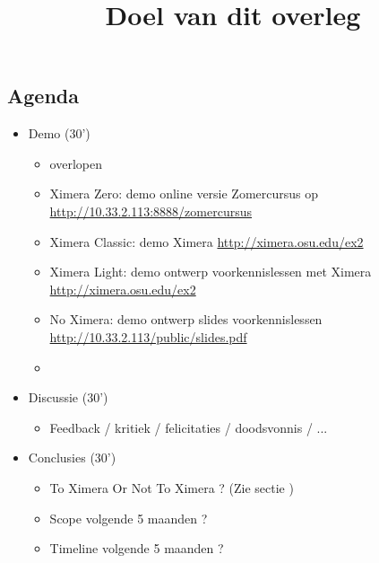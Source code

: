 \documentclass[numbers]{ximera}
\title{Doel van dit overleg}
\renewcommand{\link}{\url}
\begin{document}
\begin{abstract}
\end{abstract}
\maketitle

\subsection{Agenda}
\begin{itemize}
    \item Demo (30')
    \begin{itemize}
        \item overlopen 
        \item Ximera Zero: demo online versie Zomercursus op \link{http://10.33.2.113:8888/zomercursus}  
        \item Ximera Classic: demo Ximera \link{http://ximera.osu.edu/ex2} 
        \item Ximera Light: demo ontwerp voorkennislessen met Ximera \link{http://ximera.osu.edu/ex2}
        \item No Ximera: demo ontwerp slides voorkennislessen \link{http://10.33.2.113/public/slides.pdf} 
        \item {}
    \end{itemize}
    \item Discussie (30')
    \begin{itemize}
        \item Feedback / kritiek / felicitaties / doodsvonnis / ...
    \end{itemize}

    \item Conclusies  (30')
        \begin{itemize}
        \item To Ximera Or Not To Ximera ? (Zie sectie )
        \item Scope volgende 5 maanden ?
        \item Timeline volgende 5 maanden ?
    \end{itemize}
\end{itemize}


\end{document}
